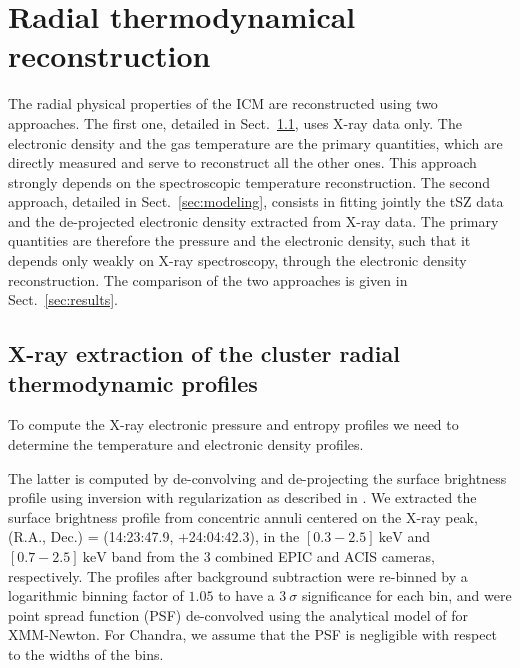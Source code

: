 \documentclass[twocolumn,traditabstract]{aa}
\begin{document}
\section{Radial thermodynamical reconstruction}\label{sec:Radial_pressure_reconstruction}
The radial physical properties of the ICM are reconstructed using two approaches. The first one, detailed in Sect.~\ref{sec:X_ray_extraction_of_the_cluster_radial_thermodynamic_profiles}, uses X-ray data only. The electronic density and the gas temperature are the primary quantities, which are directly measured and serve to reconstruct all the other ones. This approach strongly depends on the spectroscopic temperature reconstruction. The second approach, detailed in Sect.~\ref{sec:modeling}, consists in fitting jointly the tSZ data and the de-projected electronic density extracted from X-ray data. The primary quantities are therefore the pressure and the electronic density, such that it depends only weakly on X-ray spectroscopy, through the electronic density reconstruction. The comparison of the two approaches is given in Sect.~\ref{sec:results}.

\subsection{X-ray extraction of the cluster radial thermodynamic profiles}\label{sec:X_ray_extraction_of_the_cluster_radial_thermodynamic_profiles}
To compute the X-ray electronic pressure and entropy profiles we need to determine the temperature and electronic density profiles.

The latter is computed by de-convolving and de-projecting the surface brightness profile using inversion with regularization as described in \cite{croston2006}. We extracted the surface brightness profile from concentric annuli centered on the X-ray peak, (R.A., Dec.) = (14:23:47.9, +24:04:42.3), in the $[0.3-2.5] \ \si{\kilo\electronvolt}$ and $[0.7-2.5] \ \si{\kilo\electronvolt}$ band from the $3$ combined EPIC and ACIS cameras, respectively. The profiles after background subtraction were re-binned by a logarithmic binning factor of $1.05$ to have a $3 \ \sigma$ significance for each bin, and were point spread function (PSF) de-convolved using the analytical model of \cite{ghizzardi2001} for XMM-Newton. For Chandra, we assume that the PSF is negligible with respect to the widths of the bins. 
\end{document}
